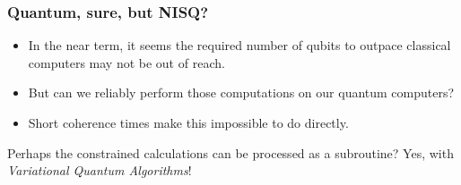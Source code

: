 \begin{frame}
    \frametitle{Quantum, sure, but NISQ?}

    \begin{itemize}
        \item In the near term, it seems the required number of qubits to outpace
                classical computers may not be out of reach.
        \item But can we reliably perform those computations on our quantum
                computers?
        \item Short coherence times make this impossible to do directly.
    \end{itemize}

    \pause

    Perhaps the constrained calculations can be processed as a subroutine? Yes,
    with \emph{Variational Quantum Algorithms}!

\end{frame}
